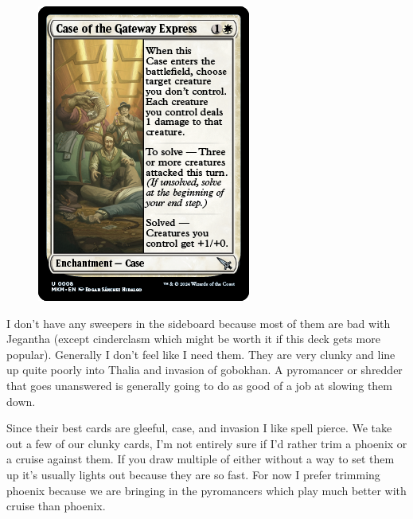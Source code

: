 \documentclass[12pt]{article}
\begin{document}
\begin{figure}
    \includegraphics[width=0.9\linewidth]{Cards/case.jpg}
\end{figure}

I don't have any sweepers in the sideboard because most of them are bad with Jegantha (except cinderclasm which might be worth it if this deck gets more popular). Generally I don't feel like I need them. They are very clunky and line up quite poorly into Thalia and invasion of gobokhan. A pyromancer or shredder that goes unanswered is generally going to do as good of a job at slowing them down.

Since their best cards are gleeful, case, and invasion I like spell pierce. We take out a few of our clunky cards, I'm not entirely sure if I'd rather trim a phoenix or a cruise against them. If you draw multiple of either without a way to set them up it's usually lights out because they are so fast. For now I prefer trimming phoenix because we are bringing in the pyromancers which play much better with cruise than phoenix.
\end{document}
